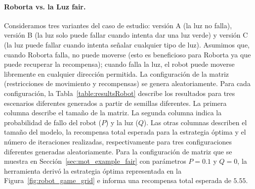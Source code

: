 \paragraph{Roborta vs. la Luz fair.}
Consideramos tres variantes del caso de estudio: versión A (la luz no falla), versión B (la luz solo puede fallar cuando intenta dar una luz verde) y versión C (la luz puede fallar cuando intenta señalar cualquier tipo de luz).
Asumimos que, cuando Roborta falla, no puede moverse (esto es beneficioso para Roborta ya que puede recuperar la recompensa);
cuando falla la luz, el robot puede moverse libremente en cualquier dirección permitida.
La configuración de la matriz (restricciones de movimiento y recompensas) se genera aleatoriamente. Para cada configuración, la Tabla~\ref{table:resultsRobot} describe los resultados para tres escenarios diferentes generados a partir de semillas diferentes. La primera columna describe el tamaño de la matriz. La segunda columna indica la probabilidad de fallo del robot ($P$) y la luz ($Q$).
Las otras columnas describen el tamaño del modelo, la recompensa total esperada para la estrategia óptima y el número de iteraciones realizadas, respectivamente para tres configuraciones diferentes generadas aleatoriamente.
Para la configuración de matriz que se muestra en Sección~\ref{sec:mot_example_fair} con parámetros $P=0.1$ y $Q=0$, la herramienta derivó la estrategia óptima representada en la Figura~\ref{fig:robot_game_grid} e informa una recompensa total esperada de $5.55$.




